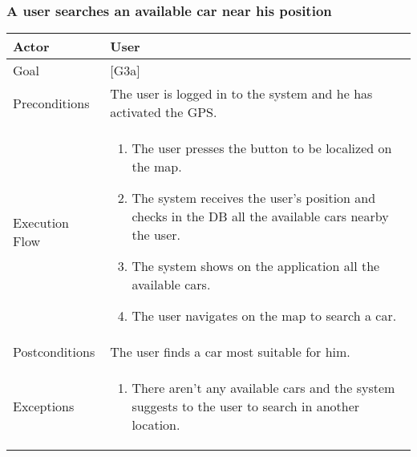 \documentclass{article}
\begin{document}
	\subsubsection{A user searches an available car near his position}
	\begin{tabularx}{\textwidth}{  l  X  }
		\hline
		Actor & User\\
		\hline
		Goal & [G3a]\\
		\hline
		Preconditions & The user is logged in to the system and he has activated the GPS.\\
		\hline
		Execution Flow & \begin{enumerate}
			\item{The user presses the button to be localized on the map.}
										 \item{The system receives the user's position and checks in the DB all the available cars nearby the user.}
										 \item{The system shows on the application all the available cars.}
										 \item{The user navigates on the map to search a car.}
										\end{enumerate}\\
		\hline
		Postconditions & The user finds a car most suitable for him.\\
		\hline
		Exceptions & \begin{enumerate}
			\item{There aren't any available cars and the system suggests to the user to search in another location.}
			\end{enumerate}\\
		\hline
	\end{tabularx}
\end{document}
